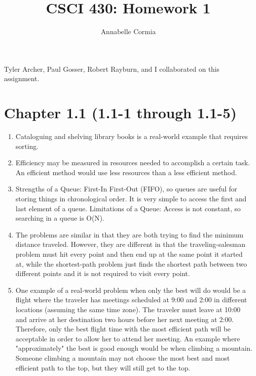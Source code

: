 \documentclass[12pt]{article}
\author{Annabelle Cormia}
\title{CSCI 430: Homework 1}
\begin{document}
\maketitle

Tyler Archer, Paul Gosser, Robert Rayburn, and I collaborated on this assignment.\newline

\section{Chapter 1.1 (1.1-1 through 1.1-5)}

\begin{enumerate}
 
  \item Cataloguing and shelving library books is a real-world example that requires sorting.

  \item Efficiency may be measured in resources needed to accomplish a certain task. An efficient method would use less resources than a less efficient method.
    
  \item Strengths of a Queue: First-In First-Out (FIFO), so queues are useful for storing things in chronological order. It is very simple to access the first and last element of a queue. \newline \newline Limitations of a Queue: Access is not constant, so searching in a queue is O(N).

  \item The problems are similar in that they are both trying to find the minimum distance traveled. However, they are different in that the traveling-salesman problem must hit every point and then end up at the same point it started at, while the shortest-path problem just finds the shortest path between two different points and it is not required to visit every point.

  \item One example of a real-world problem when only the best will do would be a flight where the traveler has meetings scheduled at 9:00 and 2:00 in different locations (assuming the same time zone). The traveler must leave at 10:00 and arrive at her destination two hours before her next meeting at 2:00. Therefore, only the best flight time with the most efficient path will be acceptable in order to allow her to attend her meeting. \newline \newline An example where "approximately" the best is good enough would be when climbing a mountain. Someone climbing a mountain may not choose the most best and most efficient path to the top, but they will still get to the top.
    
\end{enumerate}
\end{document}
